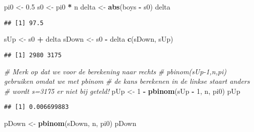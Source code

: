 \documentclass[
  12pt,dutch,coursenotes]{book}
\newenvironment{Shaded}{\begin{snugshade}}{\end{snugshade}}
\newcommand{\CommentTok}[1]{\textcolor[rgb]{0.56,0.35,0.01}{\textit{#1}}}
\newcommand{\DecValTok}[1]{\textcolor[rgb]{0.00,0.00,0.81}{#1}}
\newcommand{\FloatTok}[1]{\textcolor[rgb]{0.00,0.00,0.81}{#1}}
\newcommand{\KeywordTok}[1]{\textcolor[rgb]{0.13,0.29,0.53}{\textbf{#1}}}
\newcommand{\NormalTok}[1]{#1}
\newcommand{\OperatorTok}[1]{\textcolor[rgb]{0.81,0.36,0.00}{\textbf{#1}}}
\newcommand{\StringTok}[1]{\textcolor[rgb]{0.31,0.60,0.02}{#1}}
\theoremstyle{definition}
\theoremstyle{definition}
\theoremstyle{definition}
\theoremstyle{remark}
\begin{document}
\begin{Shaded}
\begin{Highlighting}[]
\NormalTok{pi0 \textless{}{-}}\StringTok{ }\FloatTok{0.5}
\NormalTok{s0 \textless{}{-}}\StringTok{ }\NormalTok{pi0 }\OperatorTok{*}\StringTok{ }\NormalTok{n}
\NormalTok{delta \textless{}{-}}\StringTok{ }\KeywordTok{abs}\NormalTok{(boys }\OperatorTok{{-}}\StringTok{ }\NormalTok{s0)}
\NormalTok{delta}
\end{Highlighting}
\end{Shaded}

\begin{verbatim}
## [1] 97.5
\end{verbatim}

\begin{Shaded}
\begin{Highlighting}[]
\NormalTok{sUp \textless{}{-}}\StringTok{ }\NormalTok{s0 }\OperatorTok{+}\StringTok{ }\NormalTok{delta}
\NormalTok{sDown \textless{}{-}}\StringTok{ }\NormalTok{s0 }\OperatorTok{{-}}\StringTok{ }\NormalTok{delta}
\KeywordTok{c}\NormalTok{(sDown, sUp)}
\end{Highlighting}
\end{Shaded}

\begin{verbatim}
## [1] 2980 3175
\end{verbatim}

\begin{Shaded}
\begin{Highlighting}[]
\CommentTok{\# Merk op dat we voor de berekening naar rechts}
\CommentTok{\# pbinom(sUp{-}1,n,pi) gebruiken omdat we met pbinom}
\CommentTok{\# de kans berekenen in de linkse staart anders}
\CommentTok{\# wordt s=3175 er niet bij geteld!}
\NormalTok{pUp \textless{}{-}}\StringTok{ }\DecValTok{1} \OperatorTok{{-}}\StringTok{ }\KeywordTok{pbinom}\NormalTok{(sUp }\OperatorTok{{-}}\StringTok{ }\DecValTok{1}\NormalTok{, n, pi0)}
\NormalTok{pUp}
\end{Highlighting}
\end{Shaded}

\begin{verbatim}
## [1] 0.006699883
\end{verbatim}

\begin{Shaded}
\begin{Highlighting}[]
\NormalTok{pDown \textless{}{-}}\StringTok{ }\KeywordTok{pbinom}\NormalTok{(sDown, n, pi0)}
\NormalTok{pDown}
\end{Highlighting}
\end{Shaded}
\end{document}
